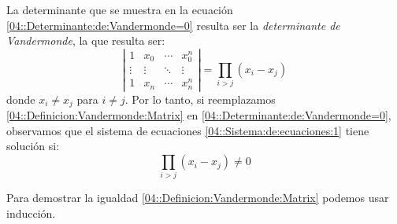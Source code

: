 \documentclass[english, spanish, fleqn, 10pt]{article}
\numberwithin{equation}{section}
\newcommand{\nparentesis}[1]{\left( #1 \right)}
\newcommand{\nabsoluto}[1]{\left| #1 \right|}
\theoremstyle{definition}
\begin{document}
La determinante que se muestra en la ecuación \eqref{04::Determinante:de:Vandermonde=0} resulta ser la \textit{determinante de Vandermonde}, la que resulta ser:
\begin{equation}\label{04::Definicion:Vandermonde:Matrix}
\nabsoluto{\begin{matrix}
	1 & x_0 & \cdots & x_0^n\\
	\vdots & \vdots  & \ddots & \vdots \\
	1 & x_n & \cdots & x_n^n
	\end{matrix}}=\prod_{i>j}\nparentesis{x_i-x_j}
\end{equation}
donde $x_i\ne x_j$ para $i\ne j$. Por lo tanto, si reemplazamos \eqref{04::Definicion:Vandermonde:Matrix} en \eqref{04::Determinante:de:Vandermonde=0}, observamos que el sistema de ecuaciones \eqref{04::Sistema:de:ecuaciones:1} tiene solución si:
\begin{equation}
\prod_{i>j}\nparentesis{x_i-x_j}\ne 0
\end{equation}

Para demostrar la igualdad \eqref{04::Definicion:Vandermonde:Matrix} podemos usar inducción.
\end{document}

